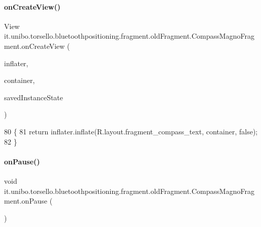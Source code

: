\paragraph{\texorpdfstring{on\+Create\+View()}{onCreateView()}}
{\footnotesize\ttfamily View it.\+unibo.\+torsello.\+bluetoothpositioning.\+fragment.\+old\+Fragment.\+Compass\+Magno\+Fragment.\+on\+Create\+View (\begin{DoxyParamCaption}\item[{Layout\+Inflater}]{inflater,  }\item[{View\+Group}]{container,  }\item[{Bundle}]{saved\+Instance\+State }\end{DoxyParamCaption})}


\begin{DoxyCode}
80                                                         \{
81         \textcolor{keywordflow}{return} inflater.inflate(R.layout.fragment\_compass\_text, container, \textcolor{keyword}{false});
82     \}
\end{DoxyCode}
\hypertarget{classit_1_1unibo_1_1torsello_1_1bluetoothpositioning_1_1fragment_1_1oldFragment_1_1CompassMagnoFragment_a6cf13eaf60004dff28dd71ef75d6d719_a6cf13eaf60004dff28dd71ef75d6d719}{}\label{classit_1_1unibo_1_1torsello_1_1bluetoothpositioning_1_1fragment_1_1oldFragment_1_1CompassMagnoFragment_a6cf13eaf60004dff28dd71ef75d6d719_a6cf13eaf60004dff28dd71ef75d6d719} 
\paragraph{\texorpdfstring{on\+Pause()}{onPause()}}
{\footnotesize\ttfamily void it.\+unibo.\+torsello.\+bluetoothpositioning.\+fragment.\+old\+Fragment.\+Compass\+Magno\+Fragment.\+on\+Pause (\begin{DoxyParamCaption}{ }\end{DoxyParamCaption})}


